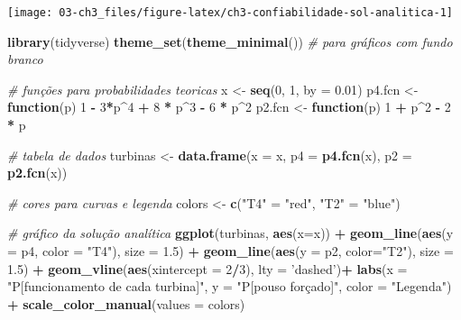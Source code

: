 \documentclass[
]{book}
\newenvironment{Shaded}{\begin{snugshade}}{\end{snugshade}}
\newcommand{\CommentTok}[1]{\textcolor[rgb]{0.56,0.35,0.01}{\textit{#1}}}
\newcommand{\ControlFlowTok}[1]{\textcolor[rgb]{0.13,0.29,0.53}{\textbf{#1}}}
\newcommand{\DataTypeTok}[1]{\textcolor[rgb]{0.13,0.29,0.53}{#1}}
\newcommand{\DecValTok}[1]{\textcolor[rgb]{0.00,0.00,0.81}{#1}}
\newcommand{\FloatTok}[1]{\textcolor[rgb]{0.00,0.00,0.81}{#1}}
\newcommand{\KeywordTok}[1]{\textcolor[rgb]{0.13,0.29,0.53}{\textbf{#1}}}
\newcommand{\NormalTok}[1]{#1}
\newcommand{\OperatorTok}[1]{\textcolor[rgb]{0.81,0.36,0.00}{\textbf{#1}}}
\newcommand{\StringTok}[1]{\textcolor[rgb]{0.31,0.60,0.02}{#1}}
\theoremstyle{definition}
\theoremstyle{definition}
\theoremstyle{definition}
\theoremstyle{remark}
\begin{document}
\texttt{[image: 03-ch3\_files/figure-latex/ch3-confiabilidade-sol-analitica-1]}

\begin{Shaded}
\begin{Highlighting}[]
\KeywordTok{library}\NormalTok{(tidyverse)}
\KeywordTok{theme_set}\NormalTok{(}\KeywordTok{theme_minimal}\NormalTok{()) }\CommentTok{# para gráficos com fundo branco}

\CommentTok{# funções para probabilidades teoricas}
\NormalTok{x <-}\StringTok{ }\KeywordTok{seq}\NormalTok{(}\DecValTok{0}\NormalTok{, }\DecValTok{1}\NormalTok{, }\DataTypeTok{by =} \FloatTok{0.01}\NormalTok{)}
\NormalTok{p4.fcn <-}\StringTok{ }\ControlFlowTok{function}\NormalTok{(p) }\DecValTok{1} \OperatorTok{-}\StringTok{ }\DecValTok{3}\OperatorTok{*}\NormalTok{p}\OperatorTok{^}\DecValTok{4} \OperatorTok{+}\StringTok{ }\DecValTok{8} \OperatorTok{*}\StringTok{ }\NormalTok{p}\OperatorTok{^}\DecValTok{3} \OperatorTok{-}\StringTok{ }\DecValTok{6} \OperatorTok{*}\StringTok{ }\NormalTok{p}\OperatorTok{^}\DecValTok{2}
\NormalTok{p2.fcn <-}\StringTok{ }\ControlFlowTok{function}\NormalTok{(p) }\DecValTok{1} \OperatorTok{+}\StringTok{ }\NormalTok{p}\OperatorTok{^}\DecValTok{2} \OperatorTok{-}\StringTok{ }\DecValTok{2} \OperatorTok{*}\StringTok{ }\NormalTok{p}

\CommentTok{# tabela de dados}
\NormalTok{turbinas <-}\StringTok{ }\KeywordTok{data.frame}\NormalTok{(}\DataTypeTok{x =}\NormalTok{ x, }\DataTypeTok{p4 =} \KeywordTok{p4.fcn}\NormalTok{(x), }\DataTypeTok{p2 =} \KeywordTok{p2.fcn}\NormalTok{(x))}

\CommentTok{# cores para curvas e legenda}
\NormalTok{colors <-}\StringTok{ }\KeywordTok{c}\NormalTok{(}\StringTok{"T4"}\NormalTok{ =}\StringTok{ "red"}\NormalTok{, }\StringTok{"T2"}\NormalTok{ =}\StringTok{ "blue"}\NormalTok{)}

\CommentTok{# gráfico da solução analítica}
\KeywordTok{ggplot}\NormalTok{(turbinas, }\KeywordTok{aes}\NormalTok{(}\DataTypeTok{x=}\NormalTok{x)) }\OperatorTok{+}\StringTok{ }
\StringTok{  }\KeywordTok{geom_line}\NormalTok{(}\KeywordTok{aes}\NormalTok{(}\DataTypeTok{y =}\NormalTok{ p4, }\DataTypeTok{color =} \StringTok{"T4"}\NormalTok{), }\DataTypeTok{size =} \FloatTok{1.5}\NormalTok{) }\OperatorTok{+}\StringTok{ }
\StringTok{  }\KeywordTok{geom_line}\NormalTok{(}\KeywordTok{aes}\NormalTok{(}\DataTypeTok{y =}\NormalTok{ p2, }\DataTypeTok{color=}\StringTok{"T2"}\NormalTok{), }\DataTypeTok{size =} \FloatTok{1.5}\NormalTok{) }\OperatorTok{+}
\StringTok{  }\KeywordTok{geom_vline}\NormalTok{(}\KeywordTok{aes}\NormalTok{(}\DataTypeTok{xintercept =} \DecValTok{2}\OperatorTok{/}\DecValTok{3}\NormalTok{), }\DataTypeTok{lty =} \StringTok{'dashed'}\NormalTok{)}\OperatorTok{+}
\StringTok{  }\KeywordTok{labs}\NormalTok{(}\DataTypeTok{x =} \StringTok{"P[funcionamento de cada turbina]"}\NormalTok{, }
       \DataTypeTok{y =} \StringTok{"P[pouso forçado]"}\NormalTok{, }\DataTypeTok{color =} \StringTok{"Legenda"}\NormalTok{) }\OperatorTok{+}
\StringTok{  }\KeywordTok{scale_color_manual}\NormalTok{(}\DataTypeTok{values =}\NormalTok{ colors)}
\end{Highlighting}
\end{Shaded}
\end{document}
